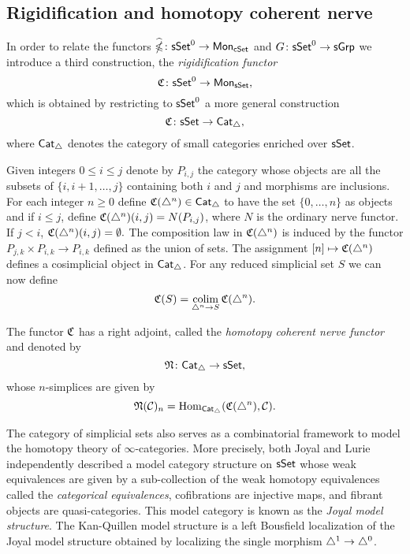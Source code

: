 \subsection{Rigidification and homotopy coherent nerve}

In order to relate the functors $\widehat{\operatorname{\mathbb{\Omega}}} \colon \mathsf{sSet}^0 \to \mathsf{Mon}_{\mathsf{cSet}}$ and $G \colon \mathsf{sSet}^0\to \mathsf{sGrp}$ we introduce a third construction, the \textit{rigidification functor}
$$\operatorname{\mathfrak{C}} \colon \mathsf{sSet}^0 \to \mathsf{Mon}_{\mathsf{sSet}},$$
which is obtained by restricting to $\mathsf{sSet}^0$ a more general construction
$$\operatorname{\mathfrak{C}} \colon \mathsf{sSet} \to \mathsf{Cat}_{\triangle},$$
where $\mathsf{Cat}_{\triangle}$ denotes the category of small categories enriched over $\mathsf{sSet}$.

Given integers $0 \leq  i \leq j$ denote by $P_{i,j}$ the category whose objects are all the subsets of $\{i, i+1, \dots, j\}$ containing both $i$ and $j$ and morphisms are inclusions.
For each integer $n \geq 0$ define $\operatorname{\mathfrak{C}}(\triangle^n) \in \mathsf{Cat}_{\triangle}$ to have the set $\{0, \dots, n\}$ as objects and if $i \leq j$, define $\operatorname{\mathfrak{C}}(\triangle^n)(i,j)= N(P_{i,j})$, where $N$ is the ordinary nerve functor.
If $j < i$, $\operatorname{\mathfrak{C}}(\triangle^n)(i,j) = \emptyset.$ The composition law in $\operatorname{\mathfrak{C}}(\triangle^n)$ is induced by the functor $P_{j,k} \times P_{i,k} \to P_{i,k}$ defined as the union of sets.
The assignment $[n] \mapsto \operatorname{\mathfrak{C}}(\triangle^n)$ defines a cosimplicial object in $\mathsf{Cat}_{\triangle}$.
For any reduced simplicial set $S$ we can now define
\begin{equation*}
\operatorname{\mathfrak{C}}(S) = \operatorname*{colim}_{\triangle^n \to S} \operatorname{\mathfrak{C}}(\triangle^n).
\end{equation*}

The functor $\operatorname{\mathfrak{C}}$ has a right adjoint, called the \textit{homotopy coherent nerve functor} and denoted by
$$\operatorname{\mathfrak{N}} \colon \mathsf{Cat}_{\triangle} \to \mathsf{sSet},$$
whose $n$-simplices are given by 
$$\operatorname{\mathfrak{N}}(\mathcal{C})_n = \mathrm{Hom}_{\mathsf{Cat}_{\triangle}}(\operatorname{\mathfrak{C}}(\triangle^n), \mathcal{C}).$$

The category of simplicial sets also serves as a combinatorial framework to model the homotopy theory of $\infty$-categories.
More precisely, both Joyal and Lurie independently described a model category structure on $\mathsf{sSet}$ whose weak equivalences are given by a sub-collection of the weak homotopy equivalences called the \textit{categorical equivalences}, cofibrations are injective maps, and fibrant objects are quasi-categories.
This model category is known as the \textit{Joyal model structure}.
The Kan-Quillen model structure is a left Bousfield localization of the Joyal model structure obtained by localizing the single morphism $\triangle^1 \to \triangle^0$.

